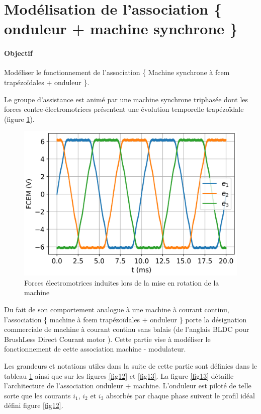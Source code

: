 
\section{Modélisation de l'association \{ onduleur + machine synchrone \}}

\paragraph{Objectif} Modéliser le fonctionnement de l'association \{ Machine synchrone à fcem trapézoïdales + onduleur \}.

Le groupe d'assistance est animé par une machine synchrone triphasée dont les forces contre-électromotrices
présentent une évolution temporelle trapézoïdale (figure \ref{fig11}).

\begin{figure}[ht!]
\begin{center}
\includegraphics[width=.5\linewidth]{img/fig11}
\caption{\label{fig11}Forces électromotrices induites lors de la mise en rotation de la machine}
\end{center}
\end{figure}

Du fait de son comportement analogue à une machine à courant continu, l'association \{ machine à fcem trapézoïdales + onduleur \} porte la désignation
commerciale de \og machine à courant continu sans balais \fg (de l'anglais BLDC pour \og BrushLess Direct Courant motor \fg). Cette partie vise à modéliser le fonctionnement de cette association machine - modulateur.

Les grandeurs et notations utiles dans la suite de cette partie sont définies dans le tableau \ref{fig11} ainsi que sur les figures \ref{fig12} et \ref{fig13}. La figure \ref{fig13} détaille l'architecture de l'association onduleur + machine. L'onduleur est piloté de telle sorte que les courants $i_1$, $i_2$ et $i_3$ absorbés par chaque phase suivent le profil idéal défini figure \ref{fig12}.


